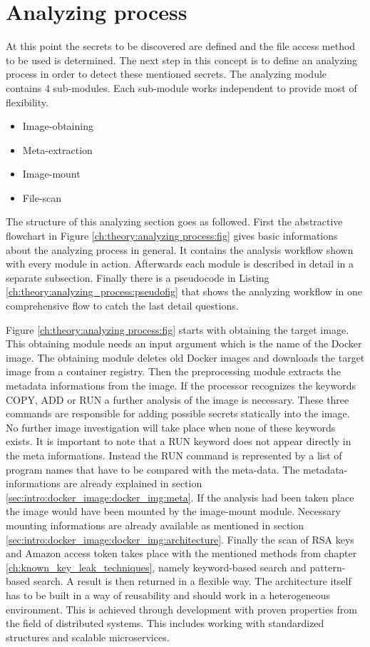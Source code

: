 \section{Analyzing process}
\label{ch:theory:analyzing_process}
At this point the secrets to be discovered are defined and the file access method to be used is determined. 
The next step in this concept is to define an analyzing process in order to detect these mentioned secrets.
The analyzing module contains 4 sub-modules.
Each sub-module works independent to provide most of flexibility.
\begin{itemize}
\item Image-obtaining
\item Meta-extraction
\item Image-mount
\item File-scan
\end{itemize}
The structure of this analyzing section goes as followed.
First the abstractive flowchart in Figure \ref{ch:theory:analyzing process:fig} gives basic informations about the analyzing process in general. 
It contains the analysis workflow shown with every module in action. 
Afterwards each module is described in detail in a separate subsection.
Finally there is a pseudocode in Listing \ref{ch:theory:analyzing_process:pseudofig} that shows the analyzing workflow in one comprehensive flow to catch the last detail questions.

Figure \ref{ch:theory:analyzing process:fig} starts with obtaining the target image. 
This obtaining module needs an input argument which is the name of the Docker image.
The obtaining module deletes old Docker images and downloads the target image from a container registry. 
Then the preprocessing module extracts the metadata informations from the image. 
If the processor recognizes the keywords COPY, ADD or RUN a further analysis of the image is necessary.
These three commands are responsible for adding possible secrets statically into the image.
No further image investigation will take place when none of these keywords exists. 
It is important to note that a RUN keyword does not appear directly in the meta informations. 
Instead the RUN command is represented by a list of program names that have to be compared with the meta-data.
The metadata-informations are already explained in section \ref{sec:intro:docker_image:docker_img:meta}.
If the analysis had been taken place the image would have been mounted by the image-mount module.
Necessary mounting informations are already available as mentioned in section \ref{sec:intro:docker_image:docker_img:architecture}.
Finally the scan of RSA keys and Amazon access token takes place with the mentioned methods from chapter \ref{ch:known_key_leak_techniques}, namely keyword-based search and pattern-based search. A result is then returned in a flexible way.
The architecture itself has to be built in a way of reusability and should work in a heterogeneous environment.
This is achieved through development with proven properties from the field of distributed systems. 
This includes working with standardized structures and scalable microservices.

